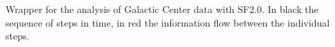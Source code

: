 Wrapper for the analysis of Galactic Center data with SF2.0. In black the sequence of steps in time, in red the information flow between the individual steps.
  
  